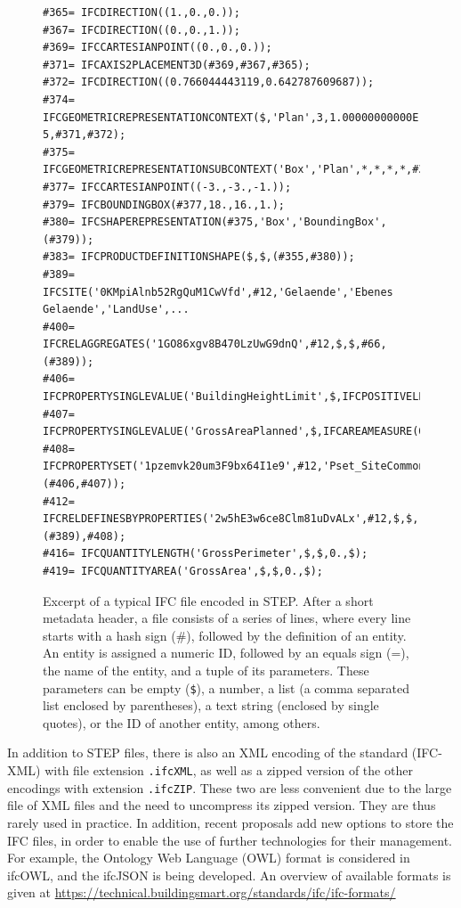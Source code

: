 \lstset{basicstyle=\footnotesize\ttfamily,breaklines=true}
\begin{figure}
\begin{lstlisting}[frame=single]
#365= IFCDIRECTION((1.,0.,0.));
#367= IFCDIRECTION((0.,0.,1.));
#369= IFCCARTESIANPOINT((0.,0.,0.));
#371= IFCAXIS2PLACEMENT3D(#369,#367,#365);
#372= IFCDIRECTION((0.766044443119,0.642787609687));
#374= IFCGEOMETRICREPRESENTATIONCONTEXT($,'Plan',3,1.00000000000E-5,#371,#372);
#375= IFCGEOMETRICREPRESENTATIONSUBCONTEXT('Box','Plan',*,*,*,*,#374,$,.PLAN_VIEW.,$);
#377= IFCCARTESIANPOINT((-3.,-3.,-1.));
#379= IFCBOUNDINGBOX(#377,18.,16.,1.);
#380= IFCSHAPEREPRESENTATION(#375,'Box','BoundingBox',(#379));
#383= IFCPRODUCTDEFINITIONSHAPE($,$,(#355,#380));
#389= IFCSITE('0KMpiAlnb52RgQuM1CwVfd',#12,'Gelaende','Ebenes Gelaende','LandUse',...
#400= IFCRELAGGREGATES('1GO86xgv8B470LzUwG9dnQ',#12,$,$,#66,(#389));
#406= IFCPROPERTYSINGLEVALUE('BuildingHeightLimit',$,IFCPOSITIVELENGTHMEASURE(9.),$);
#407= IFCPROPERTYSINGLEVALUE('GrossAreaPlanned',$,IFCAREAMEASURE(0.),$);
#408= IFCPROPERTYSET('1pzemvk20um3F9bx64I1e9',#12,'Pset_SiteCommon',$,(#406,#407));
#412= IFCRELDEFINESBYPROPERTIES('2w5hE3w6ce8Clm81uDvALx',#12,$,$,(#389),#408);
#416= IFCQUANTITYLENGTH('GrossPerimeter',$,$,0.,$);
#419= IFCQUANTITYAREA('GrossArea',$,$,0.,$);
\end{lstlisting}
\caption{Excerpt of a typical IFC file encoded in STEP\@.
After a short metadata header, a file consists of a series of lines, where every line starts with a hash sign (\#), followed by the definition of an entity.
An entity is assigned a numeric ID, followed by an equals sign (=), the name of the entity, and a tuple of its parameters.
These parameters can be empty (\texttt{\$}), a number, a list (a comma separated list enclosed by parentheses), a text string (enclosed by single quotes), or the ID of another entity, among others.}%
\label{fig:step}
\end{figure}

In addition to STEP files, there is also an XML encoding of the standard (IFC-XML) with file extension \texttt{.ifcXML}, as well as a zipped version of the other encodings with extension \texttt{.ifcZIP}.
These two are less convenient due to the large file of XML files and the need to uncompress its zipped version.
They are thus rarely used in practice.
In addition, recent proposals add new options to store the IFC files, in order to enable the use of further technologies for their management.
For example, the Ontology Web Language (OWL) format is considered in ifcOWL, and the ifcJSON is being developed.
An overview of available formats is given at \url{https://technical.buildingsmart.org/standards/ifc/ifc-formats/}

